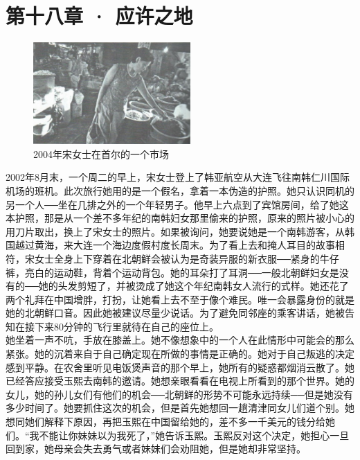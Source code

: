 \fancyhead[RO]{\thepage}
\fancyhead[LE]{\thepage}
\fancyfoot[LE,RO]{}
\fancyfoot[LO,CE]{}
\fancyfoot[CO,RE]{}
\chapter*{第十八章 · 应许之地}
\begin{figure}[!htbp]
\centering
\includegraphics[width=6cm]{./Chapters/Images/18.jpg}
\caption*{2004年宋女士在首尔的一个市场}
\end{figure}


2002年8月末，一个周二的早上，宋女士登上了韩亚航空从大连飞往南韩仁川国际机场的班机。此次旅行她用的是一个假名，拿着一本伪造的护照。她只认识同机的另一个人──坐在几排之外的一个年轻男子。他早上六点到了宾馆房间，给了她这本护照，那是从一个差不多年纪的南韩妇女那里偷来的护照，原来的照片被小心的用刀片取出，换上了宋女士的照片。如果被询问，她要说她是一个南韩游客，从韩国越过黄海，来大连一个海边度假村度长周末。为了看上去和掩人耳目的故事相符，宋女士全身上下穿着在北朝鲜会被认为是奇装异服的新衣服──紧身的牛仔裤，亮白的运动鞋，背着个运动背包。她的耳朵打了耳洞──一般北朝鲜妇女是没有的──她的头发剪短了，并被烫成了她这个年纪南韩女人流行的式样。她还花了两个礼拜在中国增胖，打扮，让她看上去不至于像个难民。唯一会暴露身份的就是她的北朝鲜口音。因此她被建议尽量少说话。为了避免同邻座的乘客讲话，她被告知在接下来80分钟的飞行里就待在自己的座位上。\\

她坐着一声不吭，手放在膝盖上。她不像想象中的一个人在此情形中可能会的那么紧张。她的沉着来自于自己确定现在所做的事情是正确的。她对于自己叛逃的决定感到平静。在农舍里听见电饭煲声音的那个早上，她所有的疑惑都烟消云散了。她已经答应接受玉熙去南韩的邀请。她想亲眼看看在电视上所看到的那个世界。她的女儿，她的孙儿女们有他们的机会──北朝鲜的形势不可能永远持续──但是她没有多少时间了。她要抓住这次的机会，但是首先她想回一趟清津同女儿们道个别。她想同她们解释下原因，再把玉熙在中国留给她的，差不多一千美元的钱分给她们。“我不能让你妹妹以为我死了，”她告诉玉熙。玉熙反对这个决定，她担心一旦回到家，她母亲会失去勇气或者妹妹们会劝阻她，但是她却非常坚持。\\

